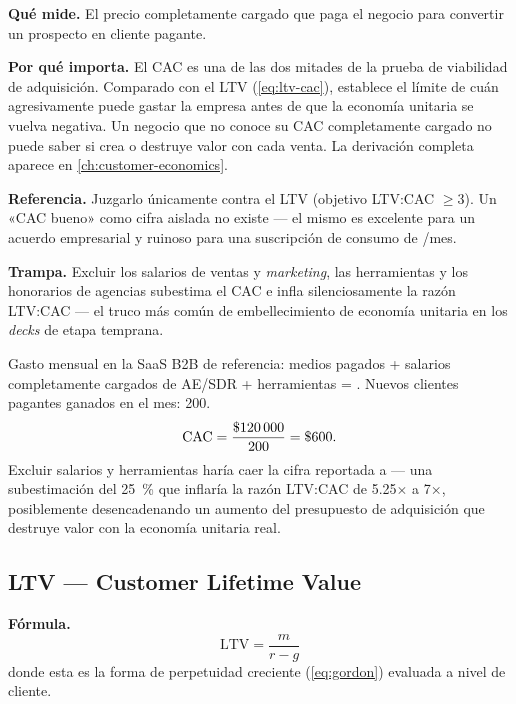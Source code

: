 \textbf{Qué mide.} El precio completamente cargado que paga el negocio para convertir un
prospecto en cliente pagante.

\textbf{Por qué importa.} El CAC es una de las dos mitades de la prueba de viabilidad de
adquisición. Comparado con el LTV (\cref{eq:ltv-cac}), establece el límite de cuán
agresivamente puede gastar la empresa antes de que la economía unitaria se vuelva negativa.
Un negocio que no conoce su CAC completamente cargado no puede saber si crea o destruye valor
con cada venta. La derivación completa aparece en \cref{ch:customer-economics}.

\textbf{Referencia.} Juzgarlo únicamente contra el LTV (objetivo LTV:CAC $\ge 3$). Un «CAC
bueno» como cifra aislada no existe --- el mismo  es excelente para un acuerdo
empresarial y ruinoso para una suscripción de consumo de /mes.

\textbf{Trampa.} Excluir los salarios de ventas y \emph{marketing}, las herramientas y los
honorarios de agencias subestima el CAC e infla silenciosamente la razón LTV:CAC --- el
truco más común de embellecimiento de economía unitaria en los \emph{decks} de etapa
temprana.

\begin{example}
Gasto mensual en la SaaS B2B de referencia: medios pagados  + salarios
completamente cargados de AE/SDR  + herramientas  = .
Nuevos clientes pagantes ganados en el mes: 200.
\[
  \mathrm{CAC} = \frac{\$\num{120000}}{200} = \$\num{600}.
\]
Excluir salarios y herramientas haría caer la cifra reportada a  --- una
subestimación del \qty{25}{\percent} que inflaría la razón LTV:CAC de 5.25$\times$ a
7$\times$, posiblemente desencadenando un aumento del presupuesto de adquisición que destruye
valor con la economía unitaria real.
\end{example}


\subsection{LTV --- Customer Lifetime Value}

\textbf{Fórmula.}
\[
  \mathrm{LTV} = \frac{m}{r - g}
\]
donde esta es la forma de perpetuidad creciente (\cref{eq:gordon}) evaluada a nivel de
cliente.

